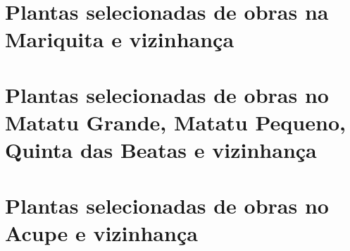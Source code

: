 \begin{anexosenv}
\chapter{Plantas selecionadas de obras na Mariquita e vizinhança}


\chapter{Plantas selecionadas de obras no Matatu Grande, Matatu Pequeno, Quinta das Beatas e vizinhança}


\chapter{Plantas selecionadas de obras no Acupe e vizinhança}



\end{anexosenv}
